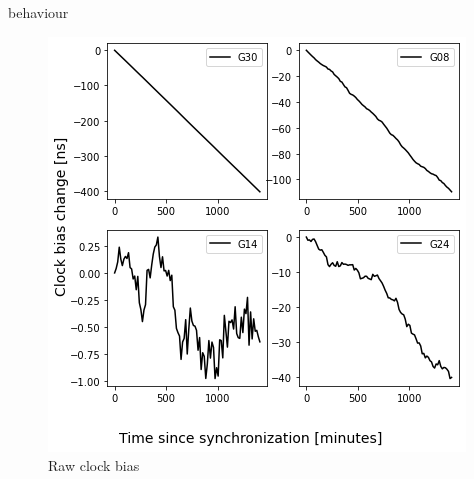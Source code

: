 \documentclass{kybernetika}
\begin{document}
behaviour
\begin{figure}[htb] 
\centering
\includegraphics[width=\textwidth]{figures/bias_raw}
\caption{Raw clock bias}
\label{fig:bias_raw}
\end{figure}

\end{document}
